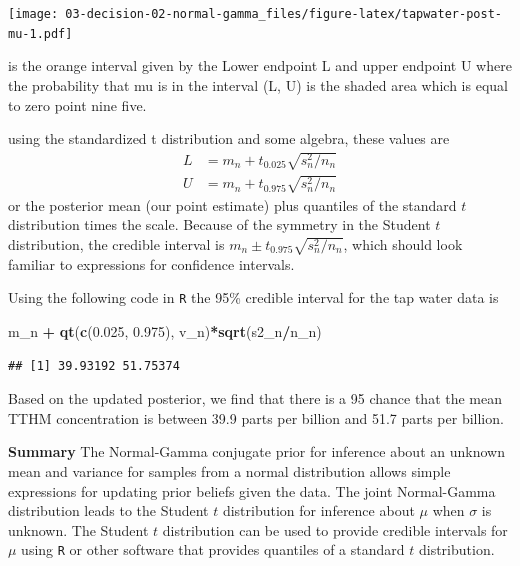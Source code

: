 \documentclass[]{book}
\newenvironment{Shaded}{\begin{snugshade}}{\end{snugshade}}
\newcommand{\KeywordTok}[1]{\textcolor[rgb]{0.13,0.29,0.53}{\textbf{#1}}}
\newcommand{\FloatTok}[1]{\textcolor[rgb]{0.00,0.00,0.81}{#1}}
\newcommand{\StringTok}[1]{\textcolor[rgb]{0.31,0.60,0.02}{#1}}
\newcommand{\OperatorTok}[1]{\textcolor[rgb]{0.81,0.36,0.00}{\textbf{#1}}}
\newcommand{\NormalTok}[1]{#1}
\theoremstyle{definition}
\theoremstyle{definition}
\theoremstyle{definition}
\theoremstyle{remark}
\begin{document}
\texttt{[image: 03-decision-02-normal-gamma\_files/figure-latex/tapwater-post-mu-1.pdf]}

is the orange interval given by the Lower endpoint L and upper endpoint
U where the probability that mu is in the interval (L, U) is the shaded
area which is equal to zero point nine five.

using the standardized t distribution and some algebra, these values are
\[
\begin{aligned}
  L & =  m_n + t_{0.025}\sqrt{s^2_n/n_n}    \\
  U & =  m_n + t_{0.975}\sqrt{s^2_n/n_n}
\end{aligned}
\] or the posterior mean (our point estimate) plus quantiles of the
standard \(t\) distribution times the scale. Because of the symmetry in
the Student \(t\) distribution, the credible interval is
\(m_n \pm t_{0.975}\sqrt{s^2_n/n_n}\), which should look familiar to
expressions for confidence intervals.

Using the following code in \texttt{R} the 95\% credible interval for
the tap water data is

\begin{Shaded}
\begin{Highlighting}[]
\NormalTok{m_n }\OperatorTok{+}\StringTok{ }\KeywordTok{qt}\NormalTok{(}\KeywordTok{c}\NormalTok{(}\FloatTok{0.025}\NormalTok{, }\FloatTok{0.975}\NormalTok{), v_n)}\OperatorTok{*}\KeywordTok{sqrt}\NormalTok{(s2_n}\OperatorTok{/}\NormalTok{n_n)}
\end{Highlighting}
\end{Shaded}

\begin{verbatim}
## [1] 39.93192 51.75374
\end{verbatim}

Based on the updated posterior, we find that there is a 95 chance that
the mean TTHM concentration is between 39.9 parts per billion and 51.7
parts per billion.

\textbf{Summary} The Normal-Gamma conjugate prior for inference about an
unknown mean and variance for samples from a normal distribution allows
simple expressions for updating prior beliefs given the data. The joint
Normal-Gamma distribution leads to the Student \(t\) distribution for
inference about \(\mu\) when \(\sigma\) is unknown. The Student \(t\)
distribution can be used to provide credible intervals for \(\mu\) using
\texttt{R} or other software that provides quantiles of a standard \(t\)
distribution.
\end{document}
